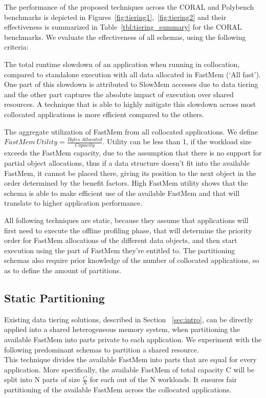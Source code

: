 The performance of the proposed techniques across the CORAL and Polybench benchmarks is depicted in Figures~\ref{fig:tiering1},~\ref{fig:tiering2} and their effectiveness is  summarized in Table~\ref{tbl:tiering_summary} for the CORAL benchmarks.
We evaluate the effectiveness of all schemas, using the following criteria: 
\begin{tightenumerate}
\item The total runtime slowdown of an application when running in collocation, compared to standalone execution with all data allocated in FastMem (`All fast'). One part of this slowdown is attributed to SlowMem accesses due to data tiering and the other part captures the absolute impact of execution over shared resources. A technique that is able to highly mitigate this slowdown across most collocated applications is more efficient compared to the others.
\item The aggregate utilization of FastMem from all collocated applications. We define \(FastMem\ Utility = \frac{Bytes\ Allocated}{Capacity}\). Utility can be less than 1, if the workload size exceeds the FastMem capacity, due to the assumption that there is no support for partial object allocations, thus if a data structure doesn't fit into the available FastMem, it cannot be placed there, giving its position to the next object 
in the order determined by the benefit factors. High FastMem utility shows that the schema is able to make efficient use of the available FastMem and that will translate to higher application performance.\\
\end{tightenumerate}

\noindent All following techniques are static, because they assume that applications will first need to execute the offline profiling phase, that will determine the priority order for FastMem allocations of the different data objects, and then start execution using the part of FastMem they're entitled to. The partitioning schemas also require prior knowledge of the number of collocated applications, so as to define the amount of partitions. 

\subsection{Static Partitioning}
\label{subsec:static}
Existing data tiering solutions, described in Section ~\ref{sec:intro},
can be directly applied into a shared heterogeneous memory system, when partitioning the available FastMem into parts private to each application. We experiment with the following predominant schemas to partition a shared resource.\\
This technique divides the available FastMem into parts that are equal for every application. More specifically, the available FastMem of total capacity C will be split into 
N parts of size $\frac{C}{N}$ for each out of the N workloads. It ensures fair partitioning of the available FastMem across the collocated applications. 

